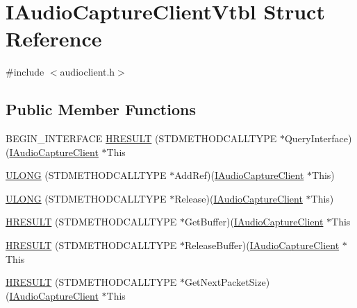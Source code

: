 \hypertarget{struct_i_audio_capture_client_vtbl}{}\section{I\+Audio\+Capture\+Client\+Vtbl Struct Reference}
\label{struct_i_audio_capture_client_vtbl}


{\ttfamily \#include $<$audioclient.\+h$>$}

\subsection*{Public Member Functions}
\begin{DoxyCompactItemize}
\item 
B\+E\+G\+I\+N\+\_\+\+I\+N\+T\+E\+R\+F\+A\+CE \hyperlink{struct_i_audio_capture_client_vtbl_ac8052eacb49311c4229c97864b0e3598}{H\+R\+E\+S\+U\+LT} (S\+T\+D\+M\+E\+T\+H\+O\+D\+C\+A\+L\+L\+T\+Y\+PE $\ast$Query\+Interface)(\hyperlink{audioclient_8h_a2d3108bb1604145f734949a5cb7a578a}{I\+Audio\+Capture\+Client} $\ast$This
\item 
\hyperlink{struct_i_audio_capture_client_vtbl_a9b5ecdd3a400088aae993bf9757bca25}{U\+L\+O\+NG} (S\+T\+D\+M\+E\+T\+H\+O\+D\+C\+A\+L\+L\+T\+Y\+PE $\ast$Add\+Ref)(\hyperlink{audioclient_8h_a2d3108bb1604145f734949a5cb7a578a}{I\+Audio\+Capture\+Client} $\ast$This)
\item 
\hyperlink{struct_i_audio_capture_client_vtbl_ab5cf94f20326e19264361d44392bbdab}{U\+L\+O\+NG} (S\+T\+D\+M\+E\+T\+H\+O\+D\+C\+A\+L\+L\+T\+Y\+PE $\ast$Release)(\hyperlink{audioclient_8h_a2d3108bb1604145f734949a5cb7a578a}{I\+Audio\+Capture\+Client} $\ast$This)
\item 
\hyperlink{struct_i_audio_capture_client_vtbl_ad8623773a58c0befbeb57cfa6a202fce}{H\+R\+E\+S\+U\+LT} (S\+T\+D\+M\+E\+T\+H\+O\+D\+C\+A\+L\+L\+T\+Y\+PE $\ast$Get\+Buffer)(\hyperlink{audioclient_8h_a2d3108bb1604145f734949a5cb7a578a}{I\+Audio\+Capture\+Client} $\ast$This
\item 
\hyperlink{struct_i_audio_capture_client_vtbl_a72ce1d030e56222adf1936dac20c7bbc}{H\+R\+E\+S\+U\+LT} (S\+T\+D\+M\+E\+T\+H\+O\+D\+C\+A\+L\+L\+T\+Y\+PE $\ast$Release\+Buffer)(\hyperlink{audioclient_8h_a2d3108bb1604145f734949a5cb7a578a}{I\+Audio\+Capture\+Client} $\ast$This
\item 
\hyperlink{struct_i_audio_capture_client_vtbl_a6af80e29891d7eb6462e5cadc6154242}{H\+R\+E\+S\+U\+LT} (S\+T\+D\+M\+E\+T\+H\+O\+D\+C\+A\+L\+L\+T\+Y\+PE $\ast$Get\+Next\+Packet\+Size)(\hyperlink{audioclient_8h_a2d3108bb1604145f734949a5cb7a578a}{I\+Audio\+Capture\+Client} $\ast$This
\end{DoxyCompactItemize}
